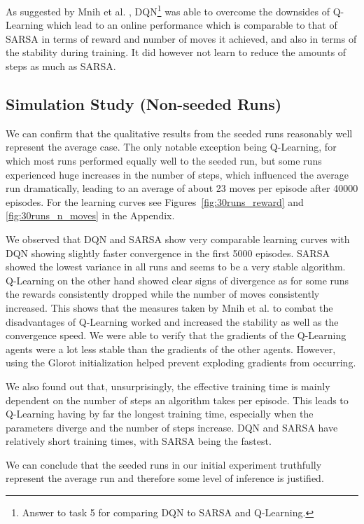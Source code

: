 \documentclass[conference]{IEEEtran}
\begin{document}
As suggested by Mnih et al. \cite{atari2013, dqn2015}, DQN\footnote{Answer to task 5 for comparing DQN to SARSA and Q-Learning.} was able to overcome the downsides of Q-Learning which lead to an online performance which is comparable to that of SARSA in terms of reward and number of moves it achieved, and also in terms of the stability during training. It did however not learn to reduce the amounts of steps as much as SARSA.


\subsection{Simulation Study (Non-seeded Runs)}

We can confirm that the qualitative results from the seeded runs reasonably well represent the average case. The only notable exception being Q-Learning, for which most runs performed equally well to the seeded run, but some runs experienced huge increases in the number of steps, which influenced the average run dramatically, leading to an average of about 23 moves per episode after 40000 episodes. For the learning curves see Figures~\ref{fig:30runs_reward} and \ref{fig:30runs_n_moves} in the Appendix. 

We observed that DQN and SARSA show very comparable learning curves with DQN showing slightly faster convergence in the first 5000 episodes. SARSA showed the lowest variance in all runs and seems to be a very stable algorithm. Q-Learning on the other hand showed clear signs of divergence as for some runs the rewards consistently dropped while the number of moves consistently increased. This shows that the measures taken by Mnih et al. \cite{dqn2015} to combat the disadvantages of Q-Learning worked and increased the stability as well as the convergence speed. We were able to verify that the gradients of the Q-Learning agents were a lot less stable than the gradients of the other agents. However, using the Glorot initialization \cite{glorot2010} helped prevent exploding gradients from occurring.

We also found out that, unsurprisingly, the effective training time is mainly dependent on the number of steps an algorithm takes per episode. This leads to Q-Learning having by far the longest training time, especially when the parameters diverge and the number of steps increase. DQN and SARSA have relatively short training times, with SARSA being the fastest.

We can conclude that the seeded runs in our initial experiment truthfully represent the average run and therefore some level of inference is justified.
\end{document}
